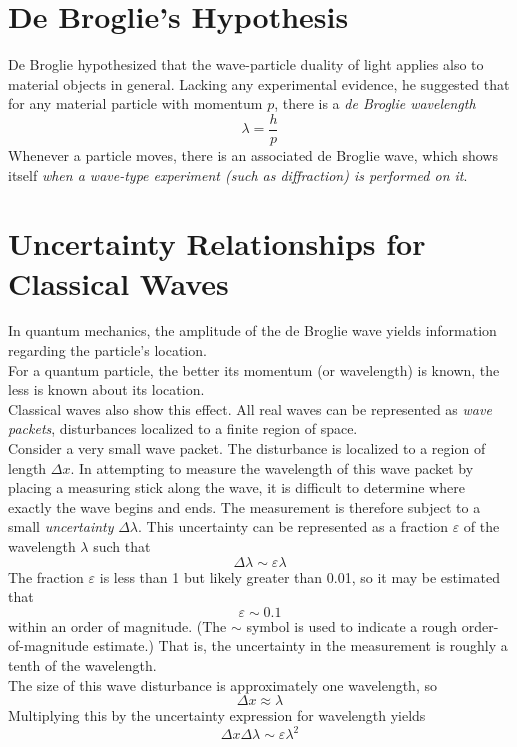 \documentclass{subfiles}
\begin{document}
	\section{De Broglie's Hypothesis}
		De Broglie hypothesized that the wave-particle duality of light applies also to material objects in general. Lacking any experimental evidence, he suggested that for any material particle with momentum \(p\), there is a \textit{de Broglie wavelength}
			\[\lambda = \frac{h}{p} \tag{de Broglie wavelength}\]
		Whenever a particle moves, there is an associated de Broglie wave, which shows itself \textit{when a wave-type experiment (such as diffraction) is performed on it}.
	\setcounter{section}{2}
	\section{Uncertainty Relationships for Classical Waves}
		In quantum mechanics, the amplitude of the de Broglie wave yields information regarding the particle's location. \\
		For a quantum particle, the better its momentum (or wavelength) is known, the less is known about its location. \\
		Classical waves also show this effect. All real waves can be represented as \textit{wave packets}, disturbances localized to a finite region of space. \\
		Consider a very small wave packet. The disturbance is localized to a region of length \(\Delta x\). In attempting to measure the wavelength of this wave packet by placing a measuring stick along the wave, it is difficult to determine where exactly the wave begins and ends. The measurement is therefore subject to a small \textit{uncertainty} \(\Delta\lambda\). This uncertainty can be represented as a fraction \(\varepsilon\) of the wavelength \(\lambda\) such that
			\[\Delta\lambda \sim \varepsilon\lambda\]
			The fraction \(\varepsilon\) is less than 1 but likely greater than 0.01, so it may be estimated that
			\[\varepsilon \sim 0.1\]
			within an order of magnitude. (The \(\sim\) symbol is used to indicate a rough order-of-magnitude estimate.) That is, the uncertainty in the measurement is roughly a tenth of the wavelength. \\
			The size of this wave disturbance is approximately one wavelength, so
			\[\Delta x \approx \lambda\]
			Multiplying this by the uncertainty expression for wavelength yields
			\[\Delta x\Delta\lambda \sim \varepsilon\lambda^2 \tag{classical position-wavelength uncertainty relationship}\]
\end{document}
